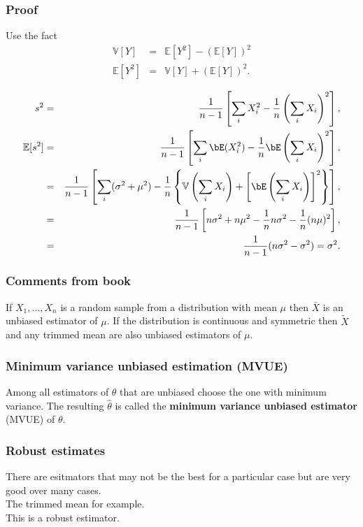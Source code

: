 \begin{frame}[fragile]\frametitle{Proof}

{\tiny

Use the fact
\begin{eqnarray*}
\mathbb V[Y] &= &\mathbb E[Y^2]-(\mathbb E[Y])^2 \\
\mathbb E[Y^2] & = & \mathbb V[Y] + (\mathbb E[Y])^2.
\end{eqnarray*}

\begin{eqnarray*}
s^2 & = & \frac{1}{n-1} \left[ \sum_i X_i^2 - \frac{1}{n} \left(\sum_i
  X_i\right)^2 \right], \\ 
\mathbb E[s^2]&= &\frac{1}{n-1} \left[\sum_i \bE(X_i^2) -\frac{1}{n}
  \bE\left(\sum_i X_i\right)^2 \right],\\ 
& = & \frac{1}{n-1} \left[ \sum_i(\sigma^2+\mu^2) - \frac{1}{n}
  \left\{\mathbb V\left(\sum_i X_i\right)+\left[\bE\left(\sum_i X_i\right)\right]^2 \right\}  \right], \\ 
& = & \frac{1}{n-1} \left[ n \sigma^2 + n \mu^2 - \frac{1}{n} n
  \sigma^2 - \frac{1}{n} (n \mu)^2 \right],\\ 
& = & \frac{1}{n-1} (n \sigma^2 - \sigma^2) = \sigma^2.
\end{eqnarray*}


}
\end{frame}




\begin{frame}[fragile]\frametitle{Comments from book}

\begin{prop}

If $X_1,...,X_n$ is a random sample from a distribution with mean
$\mu$ then $\bar{X}$ is an unbiased estimator of $\mu$. If the
distribution is continuous and symmetric then $\tilde{X}$ and
any trimmed mean are also unbiased estimators of $\mu$.
\end{prop}
\end{frame}


\begin{frame}[fragile]\frametitle{Minimum variance unbiased estimation (MVUE)}

Among all estimators of $\theta$ that are unbiased choose the
one with minimum variance. The resulting $\hat{\theta}$
is called the {\bf minimum variance unbiased estimator}
(MVUE) of $\theta$.
\end{frame}


\begin{frame}[fragile]\frametitle{Robust estimates}

There are esitmators that may not be the best for
a particular case but are very good over many cases.\\ 
The trimmed mean for example.\\ 
This is a robust estimator.
\end{frame}


